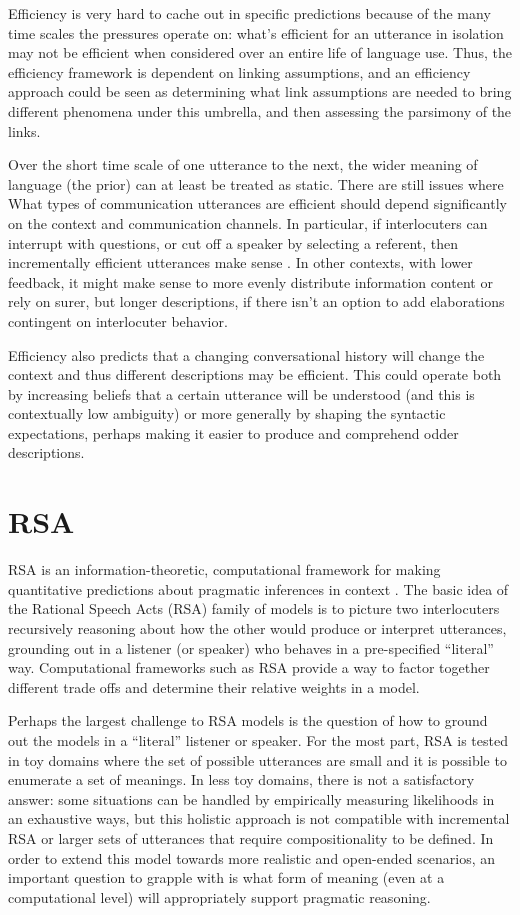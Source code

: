 \documentclass[]{article}
\begin{document}
Efficiency is very hard to cache out in specific predictions because of the many time scales the pressures operate on: what's efficient for an utterance in isolation may not be efficient when considered over an entire life of language use. Thus, the efficiency framework is dependent on linking assumptions, and an efficiency approach could be seen as determining what link assumptions are needed to bring different phenomena under this umbrella, and then assessing the parsimony of the links.

Over the short time scale of one utterance to the next, the wider meaning of language (the prior) can at least be treated as static. There are still issues where What types of communication utterances are efficient should depend significantly on the context and communication channels. In particular, if interlocuters can interrupt with questions, or cut off a speaker by selecting a referent, then incrementally efficient utterances make sense \cite{gibson2019}. In other contexts, with lower feedback, it might make sense to more evenly distribute information content or rely on surer, but longer descriptions, if there isn't an option to add elaborations contingent on interlocuter behavior.

Efficiency also predicts that a changing conversational history will change the context and thus different descriptions may be efficient. This could operate both by increasing beliefs that a certain utterance will be understood (and this is contextually low ambiguity) or more generally by shaping the syntactic expectations, perhaps making it easier to produce and comprehend odder descriptions. 

\section{RSA}

RSA is an information-theoretic, computational framework for making quantitative predictions about pragmatic inferences in context \cite{goodman2016, frank2012a}. The basic idea of the Rational Speech Acts (RSA) family of models is to picture two interlocuters recursively reasoning about how the other would produce or interpret utterances, grounding out in a listener (or speaker) who behaves in a pre-specified ``literal'' way. Computational frameworks such as RSA provide a way to factor together different trade offs and determine their relative weights in a model. 


Perhaps the largest challenge to RSA models is the question of how to ground out the models in a ``literal'' listener or speaker. For the most part, RSA is tested in toy domains where the set of possible utterances are small and it is possible to enumerate a set of meanings. In less toy domains, there is not a satisfactory answer: some situations can be handled by empirically measuring likelihoods in an exhaustive ways, but this holistic approach is not compatible with incremental RSA or larger sets of utterances that require compositionality to be defined. In order to extend this model towards more realistic and open-ended scenarios, an important question to grapple with is what form of meaning (even at a computational level) will appropriately support pragmatic reasoning. 
\end{document}
